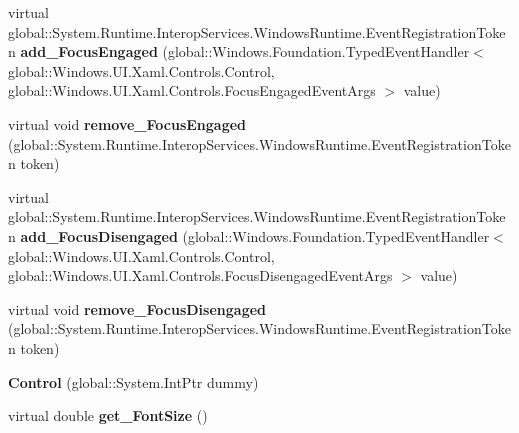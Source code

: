\begin{DoxyCompactItemize}
\mbox{\label{class_windows_1_1_u_i_1_1_xaml_1_1_controls_1_1_control_a25b5c6642d47212aa2e63ff6200ac1c7}} 
virtual global\+::\+System.\+Runtime.\+Interop\+Services.\+Windows\+Runtime.\+Event\+Registration\+Token {\bfseries add\+\_\+\+Focus\+Engaged} (global\+::\+Windows.\+Foundation.\+Typed\+Event\+Handler$<$ global\+::\+Windows.\+U\+I.\+Xaml.\+Controls.\+Control, global\+::\+Windows.\+U\+I.\+Xaml.\+Controls.\+Focus\+Engaged\+Event\+Args $>$ value)
\item 
\mbox{\label{class_windows_1_1_u_i_1_1_xaml_1_1_controls_1_1_control_aae2dfe22e085e480a19bdb599b17d9bb}} 
virtual void {\bfseries remove\+\_\+\+Focus\+Engaged} (global\+::\+System.\+Runtime.\+Interop\+Services.\+Windows\+Runtime.\+Event\+Registration\+Token token)
\item 
\mbox{\label{class_windows_1_1_u_i_1_1_xaml_1_1_controls_1_1_control_a37520b52e70f32ebd8cf57ee3b584dcf}} 
virtual global\+::\+System.\+Runtime.\+Interop\+Services.\+Windows\+Runtime.\+Event\+Registration\+Token {\bfseries add\+\_\+\+Focus\+Disengaged} (global\+::\+Windows.\+Foundation.\+Typed\+Event\+Handler$<$ global\+::\+Windows.\+U\+I.\+Xaml.\+Controls.\+Control, global\+::\+Windows.\+U\+I.\+Xaml.\+Controls.\+Focus\+Disengaged\+Event\+Args $>$ value)
\item 
\mbox{\label{class_windows_1_1_u_i_1_1_xaml_1_1_controls_1_1_control_a8242a4de1e17e601516c00e9e14f7415}} 
virtual void {\bfseries remove\+\_\+\+Focus\+Disengaged} (global\+::\+System.\+Runtime.\+Interop\+Services.\+Windows\+Runtime.\+Event\+Registration\+Token token)
\item 
\mbox{\label{class_windows_1_1_u_i_1_1_xaml_1_1_controls_1_1_control_ac6f409bd00a64ebd932806d0bd90b1cf}} 
{\bfseries Control} (global\+::\+System.\+Int\+Ptr dummy)
\item 
\mbox{\label{class_windows_1_1_u_i_1_1_xaml_1_1_controls_1_1_control_a56b25a73046ea0559a9e7cc2806702e8}} 
virtual double {\bfseries get\+\_\+\+Font\+Size} ()

\end{DoxyCompactItemize}
